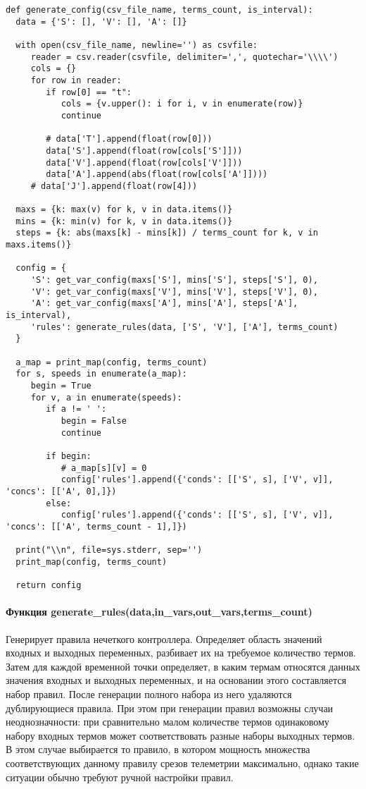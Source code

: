 \begin{lstlisting}[style=pythonstyle,caption={  }, label=lst:func:1]
  def generate_config(csv_file_name, terms_count, is_interval):
  data = {'S': [], 'V': [], 'A': []}

  with open(csv_file_name, newline='') as csvfile:
     reader = csv.reader(csvfile, delimiter=',', quotechar='\\\\')
     cols = {}
     for row in reader:
        if row[0] == "t":
           cols = {v.upper(): i for i, v in enumerate(row)}
           continue

        # data['T'].append(float(row[0]))
        data['S'].append(float(row[cols['S']]))
        data['V'].append(float(row[cols['V']]))
        data['A'].append(abs(float(row[cols['A']])))
     # data['J'].append(float(row[4]))

  maxs = {k: max(v) for k, v in data.items()}
  mins = {k: min(v) for k, v in data.items()}
  steps = {k: abs(maxs[k] - mins[k]) / terms_count for k, v in maxs.items()}

  config = {
     'S': get_var_config(maxs['S'], mins['S'], steps['S'], 0),
     'V': get_var_config(maxs['V'], mins['V'], steps['V'], 0),
     'A': get_var_config(maxs['A'], mins['A'], steps['A'], is_interval),
     'rules': generate_rules(data, ['S', 'V'], ['A'], terms_count)
  }

  a_map = print_map(config, terms_count)
  for s, speeds in enumerate(a_map):
     begin = True
     for v, a in enumerate(speeds):
        if a != ' ':
           begin = False
           continue

        if begin:
           # a_map[s][v] = 0
           config['rules'].append({'conds': [['S', s], ['V', v]], 'concs': [['A', 0],]})
        else:
           config['rules'].append({'conds': [['S', s], ['V', v]], 'concs': [['A', terms_count - 1],]})

  print("\\n", file=sys.stderr, sep='')
  print_map(config, terms_count)

  return config
\end{lstlisting}

\paragraph{Функция generate\_rules(data,in\_vars,out\_vars,terms\_count)}

Генерирует правила нечеткого контроллера. Определяет область значений входных и выходных переменных, разбивает их на требуемое количество термов. Затем для каждой временной точки определяет, в каким термам относятся данных значения входных и выходных переменных, и на основании этого составляется набор правил. После генерации полного набора из него удаляются дублирующиеся правила. При этом при генерации правил возможны случаи неоднозначности: при сравнительно малом количестве термов одинаковому набору входных термов может соответствовать разные наборы выходных термов. В этом случае выбирается то правило, в котором мощность множества соответствующих данному правилу срезов телеметрии максимально, однако такие ситуации обычно требуют ручной настройки правил.

